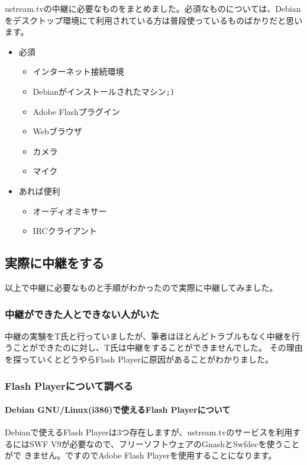 \documentclass[mingoth,a4paper]{jsarticle}
\begin{document}
ustream.tvの中継に必要なものをまとめました。必須なものについては、Debian
をデスクトップ環境にて利用されている方は普段使っているものばかりだと思い
ます。

\begin{itemize}
 \item 必須
       \begin{itemize}
	\item インターネット接続環境
	\item Debianがインストールされたマシン\verb|;)|
	\item Adobe Flashプラグイン
	\item Webブラウザ
	\item カメラ
	\item マイク
       \end{itemize}
 \item あれば便利
       \begin{itemize}
	\item オーディオミキサー
	\item IRCクライアント
       \end{itemize}
\end{itemize}

\subsection{実際に中継をする}

以上で中継に必要なものと手順がわかったので実際に中継してみました。

\subsubsection{中継ができた人とできない人がいた}

中継の実験をT氏と行っていましたが、筆者はほとんどトラブルもなく中継を行
うことができたのに対し、T氏は中継をすることができませんでした。
その理由を探っていくとどうやらFlash Playerに原因があることがわかりました。

\subsubsection{Flash Playerについて調べる}

\paragraph{Debian GNU/Linux(i386)で使えるFlash Playerについて}

Debianで使えるFlash Playerは3つ存在しますが、ustream.tvのサービスを利用す
るにはSWF V9が必要なので、フリーソフトウェアのGnashとSwfdecを使うことがで
きません。ですのでAdobe Flash Playerを使用することになります。
\end{document}
